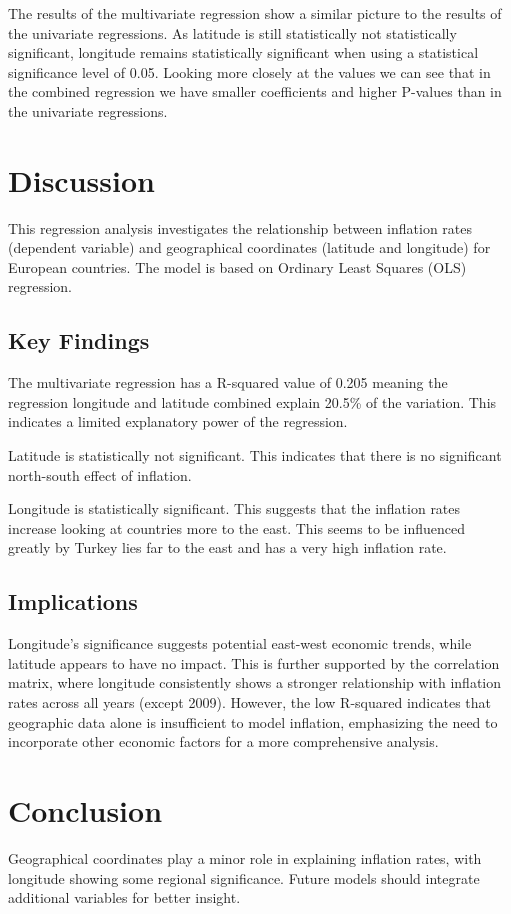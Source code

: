 \documentclass{article}
\begin{document}
    The results of the multivariate regression show a similar picture to the results of the univariate regressions. As latitude is still statistically not statistically significant, longitude remains statistically significant when using a statistical significance level of 0.05. Looking more closely at the values we can see that in the combined regression we have smaller coefficients and higher P-values than in the univariate regressions.
    
    \section{Discussion}
    This regression analysis investigates the relationship between inflation rates (dependent variable) and geographical coordinates (latitude and longitude) for European countries. The model is based on Ordinary Least Squares (OLS) regression.
    
    \subsection{Key Findings}

    The multivariate regression has a R-squared value of 0.205 meaning the regression longitude and latitude combined explain 20.5\% of the variation. This indicates a limited explanatory power of the regression.

    Latitude is statistically not significant. This indicates that there is no significant north-south effect of inflation.

    Longitude is statistically significant. This suggests that the inflation rates increase looking at countries more to the east. This seems to be influenced greatly by Turkey lies far to the east and has a very high inflation rate.

    \subsection{Implications}
    Longitude's significance suggests potential east-west economic trends, while latitude appears to have no impact. This is further supported by the correlation matrix, where longitude consistently shows a stronger relationship with inflation rates across all years (except 2009). However, the low R-squared indicates that geographic data alone is insufficient to model inflation, emphasizing the need to incorporate other economic factors for a more comprehensive analysis.

    \section{Conclusion}
    Geographical coordinates play a minor role in explaining inflation rates, with longitude showing some regional significance. Future models should integrate additional variables for better insight.

    \newpage
    \printbibliography
\end{document}
